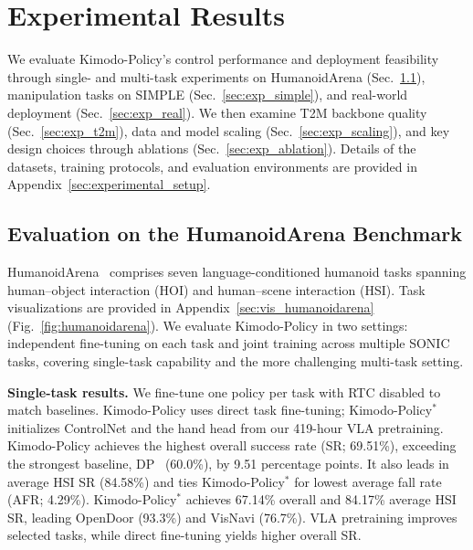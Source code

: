 \section{Experimental Results}
\label{sec:experiments}

We evaluate Kimodo-Policy's control performance and deployment feasibility through single- and multi-task experiments on HumanoidArena (Sec.~\ref{sec:exp_simulation}), manipulation tasks on SIMPLE (Sec.~\ref{sec:exp_simple}), and real-world deployment (Sec.~\ref{sec:exp_real}). We then examine T2M backbone quality (Sec.~\ref{sec:exp_t2m}), data and model scaling (Sec.~\ref{sec:exp_scaling}), and key design choices through ablations (Sec.~\ref{sec:exp_ablation}). Details of the datasets, training protocols, and evaluation environments are provided in Appendix~\ref{sec:experimental_setup}.

\subsection{Evaluation on the HumanoidArena Benchmark}
\label{sec:exp_simulation}

HumanoidArena~\cite{humanoidarena} comprises seven language-conditioned humanoid tasks spanning human--object interaction (HOI) and human--scene interaction (HSI). Task visualizations are provided in Appendix~\ref{sec:vis_humanoidarena} (Fig.~\ref{fig:humanoidarena}). We evaluate Kimodo-Policy in two settings: independent fine-tuning on each task and joint training across multiple SONIC tasks, covering single-task capability and the more challenging multi-task setting.



\pagebreak
\begingroup
\setlength{\intextsep}{6pt plus 1pt minus 1pt}
\textbf{Single-task results.} We fine-tune one policy per task with RTC disabled to match baselines. Kimodo-Policy uses direct task fine-tuning; Kimodo-Policy$^{*}$ initializes ControlNet and the hand head from our 419-hour VLA pretraining. Kimodo-Policy achieves the highest overall success rate (SR; 69.51\%), exceeding the strongest baseline, DP~\cite{chi2023diffusionpolicy} (60.0\%), by 9.51 percentage points. It also leads in average HSI SR (84.58\%) and ties Kimodo-Policy$^{*}$ for lowest average fall rate (AFR; 4.29\%). Kimodo-Policy$^{*}$ achieves 67.14\% overall and 84.17\% average HSI SR, leading OpenDoor (93.3\%) and VisNavi (76.7\%). VLA pretraining improves selected tasks, while direct fine-tuning yields higher overall SR.



